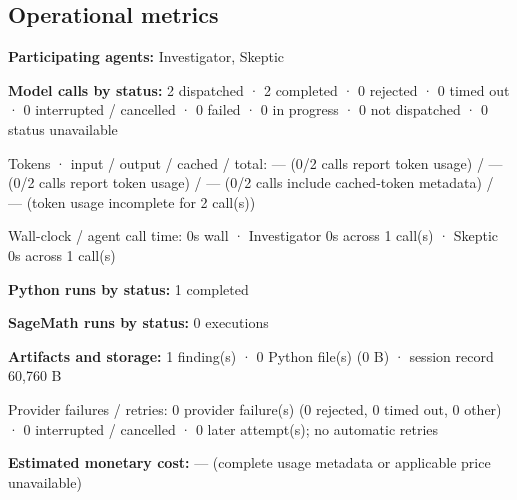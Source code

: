 \documentclass[11pt]{article}
\begin{document}
\subsection{Operational metrics}
\textbf{Participating agents:} Investigator, Skeptic\par
\textbf{Model calls by status:} 2 dispatched · 2 completed · 0 rejected · 0 timed out · 0 interrupted / cancelled · 0 failed · 0 in progress · 0 not dispatched · 0 status unavailable\par
Tokens · input / output / cached / total: — (0/2 calls report token usage) / — (0/2 calls report token usage) / — (0/2 calls include cached-token metadata) / — (token usage incomplete for 2 call(s))\par
Wall-clock / agent call time: 0s wall · Investigator 0s across 1 call(s) · Skeptic 0s across 1 call(s)\par
\textbf{Python runs by status:} 1 completed\par
\textbf{SageMath runs by status:} 0 executions\par
\textbf{Artifacts and storage:} 1 finding(s) · 0 Python file(s) (0 B) · session record 60,760 B\par
Provider failures / retries: 0 provider failure(s) (0 rejected, 0 timed out, 0 other) · 0 interrupted / cancelled · 0 later attempt(s); no automatic retries\par
\textbf{Estimated monetary cost:} — (complete usage metadata or applicable price unavailable)\par
\end{document}

